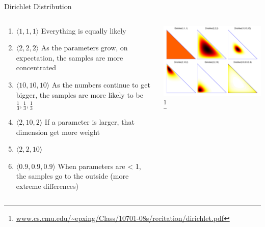 \documentclass[aspectratio=169]{beamer}
\begin{document}
\begin{frame}{Dirichlet Distribution}

\begin{columns}
\begin{column}{0.5\textwidth}
\begin{enumerate}
\item $\langle 1,1,1 \rangle$ Everything is equally likely
\item  $\langle 2,2,2 \rangle$ As the parameters grow, on expectation, the samples are more concentrated
\item $\langle 10,10,10 \rangle$ As the numbers continue to get bigger, the samples are more likely to be $\frac{1}{3},\frac{1}{3},\frac{1}{3}$
\item $\langle 2,10,2 \rangle$ If a parameter is larger, that dimension get more weight
\item $\langle 2,2,10 \rangle$
\item $\langle 0.9,0.9,0.9 \rangle$ When parameters are < 1, the samples go to the outside (more extreme differences)
\end{enumerate}
\end{column}
\begin{column}{0.5\textwidth}
\includegraphics[width=1\textwidth]{lectMM/400px-Dirichlet.png}\footnote{\url{www.cs.cmu.edu/~epxing/Class/10701-08s/recitation/dirichlet.pdf}}
\end{column}
\end{columns}
\end{frame}
\end{document}
